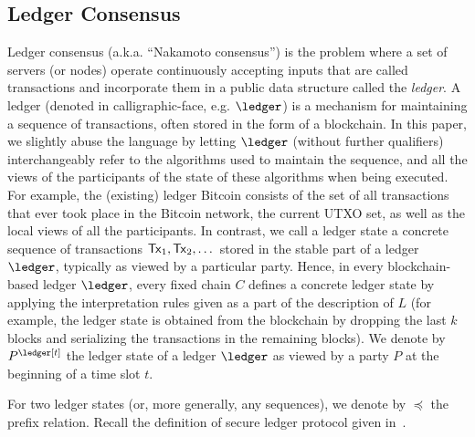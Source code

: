 \subsection{Ledger Consensus}
Ledger consensus (a.k.a. ``Nakamoto consensus'') is the problem where a set of servers
(or nodes) operate continuously accepting inputs
that are called transactions and incorporate them in a public data 
structure called the {\em ledger}. 
A ledger (denoted in calligraphic-face, e.g. $\ledger$) is a mechanism for maintaining a sequence of transactions, often
stored in the form of a blockchain. In this paper, we slightly abuse the language by letting $\ledger$ (without further
qualifiers) interchangeably refer to the algorithms used to maintain the sequence, and all the views of the
participants of the state of these algorithms when being executed. For example, the (existing) ledger Bitcoin
consists of the set of all transactions that ever took place in the Bitcoin network, the current UTXO set, as
well as the local views of all the participants.
In contrast, we call a ledger state a concrete sequence of transactions $\mathsf{Tx}_1,\mathsf{Tx}_2,\dots$ stored in the stable
part of a ledger $\ledger$, typically as viewed by a particular party. Hence, in every blockchain-based ledger $\ledger$,
every fixed chain $C$ defines a concrete ledger state by applying the interpretation rules given as a part of the
description of $L$ (for example, the ledger state is obtained from the blockchain by dropping the last $k$ blocks
and serializing the transactions in the remaining blocks). We denote by $P^\ledger[t]$
the ledger state of a ledger $\ledger$ as viewed by a party $P$ at the beginning of a time slot $t$.


For two ledger states (or, more generally, any sequences), we denote by $\preceq$ the prefix relation.
Recall the definition of secure ledger protocol given in~\cite{sok}.





